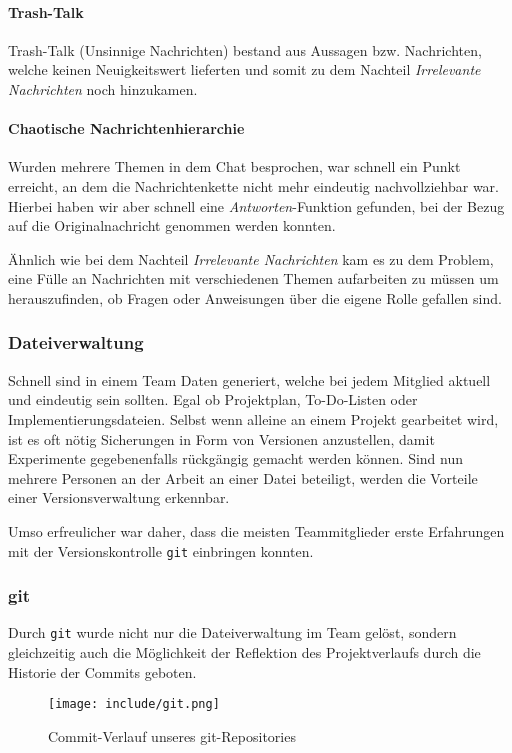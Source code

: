 \paragraph{Trash-Talk}
Trash-Talk (Unsinnige Nachrichten) bestand aus Aussagen bzw. Nachrichten, welche keinen Neuigkeitswert lieferten und somit zu dem Nachteil \emph{Irrelevante Nachrichten} noch hinzukamen.
\paragraph{Chaotische Nachrichtenhierarchie}
Wurden mehrere Themen in dem Chat besprochen, war schnell ein Punkt erreicht, an dem die Nachrichtenkette nicht mehr eindeutig nachvollziehbar war. Hierbei haben wir aber schnell eine \emph{Antworten}-Funktion gefunden, bei der Bezug auf die Originalnachricht genommen werden konnten.

Ähnlich wie bei dem Nachteil \emph{Irrelevante Nachrichten} kam es zu dem Problem, eine Fülle an Nachrichten mit verschiedenen Themen aufarbeiten zu müssen um herauszufinden, ob Fragen oder Anweisungen über die eigene Rolle gefallen sind.

\subsubsection{Dateiverwaltung}
Schnell sind in einem Team Daten generiert, welche bei jedem Mitglied aktuell und eindeutig sein sollten. Egal ob Projektplan, To-Do-Listen oder Implementierungsdateien. Selbst wenn alleine an einem Projekt gearbeitet wird, ist es oft nötig Sicherungen in Form von Versionen anzustellen, damit Experimente gegebenenfalls rückgängig gemacht werden können. 
Sind nun mehrere Personen an der Arbeit an einer Datei beteiligt, werden die Vorteile einer Versionsverwaltung erkennbar.

Umso erfreulicher war daher, dass die meisten Teammitglieder erste Erfahrungen mit der Versionskontrolle \texttt{git} einbringen konnten.
\subsubsection*{git}
Durch \texttt{git} wurde nicht nur die Dateiverwaltung im Team gelöst, sondern gleichzeitig auch die Möglichkeit der Reflektion des Projektverlaufs durch die Historie der Commits geboten. 
\begin{figure}[!ht]
\centering
\texttt{[image: include/git.png]}
\label{fig:git}
\caption{Commit-Verlauf unseres git-Repositories}
\end{figure}
